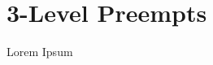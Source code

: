 \documentclass[tom-ari]{subfile}
\begin{document}
	
	\chapter{3-Level Preempts}
	
	Lorem Ipsum
	
	\lipsum[4]
	
\end{document}
